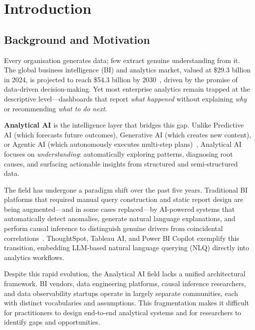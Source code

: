 \documentclass[12pt, a4paper]{article}
\begin{document}
\newpage

\section{Introduction}\label{sec:intro}

\subsection{Background and Motivation}
Every organisation generates data; few extract genuine understanding from it. The global business intelligence (BI) and analytics market, valued at \$29.3 billion in 2024, is projected to reach \$54.3 billion by 2030~\citep{grandview2025bi}, driven by the promise of data-driven decision-making. Yet most enterprise analytics remain trapped at the descriptive level---dashboards that report \emph{what happened} without explaining \emph{why} or recommending \emph{what to do next}.

\textbf{Analytical AI} is the intelligence layer that bridges this gap. Unlike Predictive AI (which forecasts future outcomes), Generative AI (which creates new content), or Agentic AI (which autonomously executes multi-step plans)~\citep{mahdi2026taxonomy}, Analytical AI focuses on \emph{understanding}: automatically exploring patterns, diagnosing root causes, and surfacing actionable insights from structured and semi-structured data.

The field has undergone a paradigm shift over the past five years. Traditional BI platforms that required manual query construction and static report design are being augmented---and in some cases replaced---by AI-powered systems that automatically detect anomalies, generate natural language explanations, and perform causal inference to distinguish genuine drivers from coincidental correlations~\citep{gartner2024augmented}. ThoughtSpot, Tableau AI, and Power BI Copilot exemplify this transition, embedding LLM-based natural language querying (NLQ) directly into analytics workflows.

Despite this rapid evolution, the Analytical AI field lacks a unified architectural framework. BI vendors, data engineering platforms, causal inference researchers, and data observability startups operate in largely separate communities, each with distinct vocabularies and assumptions. This fragmentation makes it difficult for practitioners to design end-to-end analytical systems and for researchers to identify gaps and opportunities.
\end{document}
